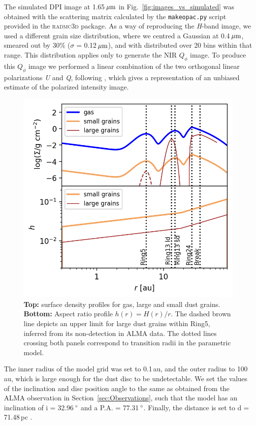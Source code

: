 \documentclass[usenatbib,times]{mnras}
\begin{document}
The simulated DPI image at 1.65\,$\hbox{$\mu$m}$ in Fig.~\ref{fig:images_vs_simulated} was obtained with the scattering matrix calculated by the {\tt makeopac.py} script provided in the \textsc{radmc3d} package. As a way of reproducing the \textit{H}-band image, we used a different grain size distribution, where we centred a Gaussian at 0.4\,$\hbox{$\mu$m}$, smeared out by 30\% ($\sigma$ = 0.12\,$\hbox{$\mu$m}$), and with distributed over 20 bins within that range. This distribution applies only to generate the NIR $Q_\phi$ image. To produce this $Q_\phi$ image we performed a linear combination of the two orthogonal linear polarizations \textit{U} and \textit{Q}, following \citet{Avenhaus_2017}, which gives a representation of an unbiased estimate of the polarized intensity image.

\begin{figure}
	\includegraphics[width=\columnwidth]{allprofiles.png}
        \caption{{\bf Top:} surface density profiles for gas, large and small dust grains. {\bf Bottom:} Aspect ratio profile $h(r)= H(r)/r$. The dashed brown line depicts an upper limit for large dust grains within Ring5, inferred from its non-detection in ALMA data. The dotted lines crossing both panels correspond to transition radii in the parametric model.}
    \label{fig:profiles}
\end{figure}

The inner radius of the model grid was set to 0.1\,au, and the outer radius to 100\,au, which is large enough for the dust disc to be undetectable. We set the values of the inclination and disc position angle to the same as obtained from the ALMA observation in Section~\ref{sec:Observations}, such that the model has an inclination of i = 32.96\,$\hbox{$^\circ$}$ and a P.A. = 77.31\,$\hbox{$^\circ$}$. Finally, the distance is set to d = 71.48\,pc \citep{gaiacollaboration2020gaia}.
\end{document}

